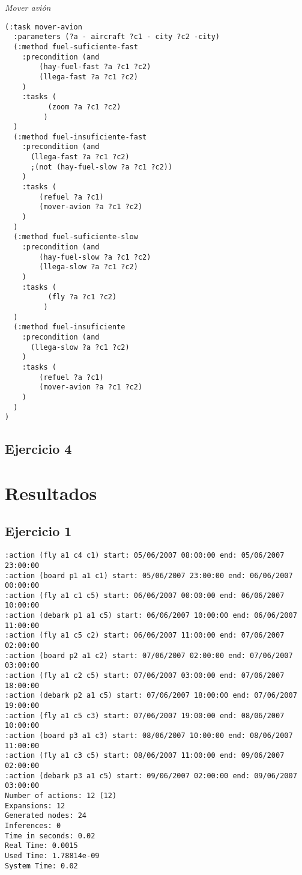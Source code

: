 \documentclass{article}
\begin{document}
\emph{Mover avión}

\begin{lstlisting}
(:task mover-avion
  :parameters (?a - aircraft ?c1 - city ?c2 -city)
  (:method fuel-suficiente-fast 
    :precondition (and
        (hay-fuel-fast ?a ?c1 ?c2)
        (llega-fast ?a ?c1 ?c2)
    )
    :tasks (
          (zoom ?a ?c1 ?c2)
         )
  )
  (:method fuel-insuficiente-fast
    :precondition (and
      (llega-fast ?a ?c1 ?c2)
      ;(not (hay-fuel-slow ?a ?c1 ?c2))
    )
    :tasks (
        (refuel ?a ?c1)
        (mover-avion ?a ?c1 ?c2)
    )
  )
  (:method fuel-suficiente-slow 
    :precondition (and
        (hay-fuel-slow ?a ?c1 ?c2)
        (llega-slow ?a ?c1 ?c2)
    )
    :tasks (
          (fly ?a ?c1 ?c2)
         )
  )
  (:method fuel-insuficiente
    :precondition (and
      (llega-slow ?a ?c1 ?c2)
    )
    :tasks (
        (refuel ?a ?c1)
        (mover-avion ?a ?c1 ?c2)
    )
  )
)
\end{lstlisting}

\subsection*{Ejercicio 4}



\section*{Resultados}
\subsection*{Ejercicio 1}

\begin{lstlisting}
:action (fly a1 c4 c1) start: 05/06/2007 08:00:00 end: 05/06/2007 23:00:00
:action (board p1 a1 c1) start: 05/06/2007 23:00:00 end: 06/06/2007 00:00:00
:action (fly a1 c1 c5) start: 06/06/2007 00:00:00 end: 06/06/2007 10:00:00
:action (debark p1 a1 c5) start: 06/06/2007 10:00:00 end: 06/06/2007 11:00:00
:action (fly a1 c5 c2) start: 06/06/2007 11:00:00 end: 07/06/2007 02:00:00
:action (board p2 a1 c2) start: 07/06/2007 02:00:00 end: 07/06/2007 03:00:00
:action (fly a1 c2 c5) start: 07/06/2007 03:00:00 end: 07/06/2007 18:00:00
:action (debark p2 a1 c5) start: 07/06/2007 18:00:00 end: 07/06/2007 19:00:00
:action (fly a1 c5 c3) start: 07/06/2007 19:00:00 end: 08/06/2007 10:00:00
:action (board p3 a1 c3) start: 08/06/2007 10:00:00 end: 08/06/2007 11:00:00
:action (fly a1 c3 c5) start: 08/06/2007 11:00:00 end: 09/06/2007 02:00:00
:action (debark p3 a1 c5) start: 09/06/2007 02:00:00 end: 09/06/2007 03:00:00
Number of actions: 12 (12)
Expansions: 12
Generated nodes: 24
Inferences: 0
Time in seconds: 0.02
Real Time: 0.0015
Used Time: 1.78814e-09
System Time: 0.02
\end{lstlisting}
\end{document}
